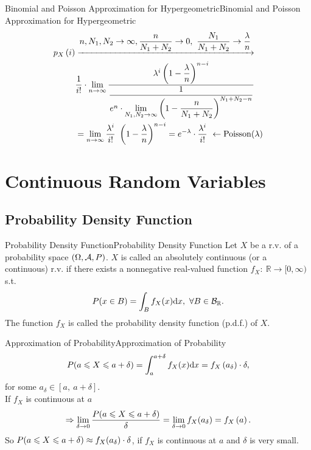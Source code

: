\documentclass{elegantbook}
\begin{document}
\begin{remark}{Binomial and Poisson Approximation for Hypergeometric}{Binomial and Poisson Approximation for Hypergeometric}
$$\begin{aligned}
p_X\left(i\right)&\xrightarrow{\dis n,N_1,N_2\rightarrow\infty,\dfrac{n}{N_1+N_2}\rightarrow0,\ \dfrac{N_1}{N_1+N_2}\rightarrow\dfrac{\lambda}{n}}\\
&\frac{1}{i!}\cdot\limn{\dfrac{\lambda^i\left(1-\dfrac{\lambda}{n}\right)^{n-i}}{\dfrac{1}{e^n\cdot\lim\limits_{N_1,N_2\rightarrow\infty}{\left(1-\dfrac{n}{N_1+N_2}\right)^{N_1+N_2-n}}}}}\\
&=\lim\limits_{n\rightarrow\infty}{\frac{\lambda^i}{i!}}\ \left(1-\frac{\lambda}{n}\right)^{n-i}=e^{-\lambda}\cdot\frac{\lambda^i}{i!}\ \leftarrow\mathrm{Poisson}(\lambda)\\
\end{aligned}
$$
\end{remark}

\chapter{Continuous Random Variables}
\section{Probability Density Function}

\begin{definition}{Probability Density Function}{Probability Density Function}
Let $X$ be a r.v. of a probability space $(\Omega,\mathcal{A}, P)$. $X$ is called an absolutely continuous (or a continuous) r.v. if there exists a nonnegative real-valued function $f_X:\ \mathbb{R}\rightarrow[0,\infty)$ s.t.
$$
P(x\in B)=\int_{B}{f_X(x)\dif x},\ \forall B\in \mb_\mr.
$$
The function $f_X$ is called the probability density function (p.d.f.) of $X$.
\end{definition}

\begin{remark}{Approximation of Probability}{Approximation of Probability}
$$
P(a\ls X\ls a+\delta)=\int_{a}^{a+\delta}{f_X(x)\dif x}=f_X\left(a_\delta\right)\cdot\delta,
$$
for some $a_\delta\in[a,\ a+\delta]$.\\
If $f_X$ is continuous at $a$
$$
\Rightarrow\lim\limits_{\delta\rightarrow0}{\dfrac{P(a\leqslant X\leqslant a+\delta)}{\delta}}=\lim\limits_{\delta\rightarrow0}{f_X(a_\delta)}=f_X\left(a\right).
$$
So $P(a\leqslant X\leqslant a+\delta)\approx f_X(a_\delta)\cdot\delta$, if $f_X$ is continuous at $a$ and $\delta$ is very small.
\end{remark}
\end{document}
